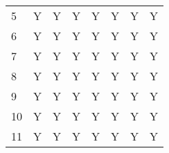 \begin{table}[hbt]
\begin{tabular}{@{}lccccccc@{}}
\cellcolor[HTML]{C0C0C0}5  & Y                                                 & Y                                                 & Y                                                 & Y                                                 & Y                                                 & Y                                                 & Y                                                 \\
\cellcolor[HTML]{C0C0C0}6  & Y                                                 & Y                                                 & Y                                                 & Y                                                 & Y                                                 & Y                                                 & Y                                                 \\
\cellcolor[HTML]{C0C0C0}7  & Y                                                 & Y                                                 & Y                                                 & Y                                                 & Y                                                 & Y                                                 & Y                                                 \\
\cellcolor[HTML]{C0C0C0}8  & Y                                                 & Y                                                 & Y                                                 & Y                                                 & Y                                                 & Y                                                 & Y                                                 \\
\cellcolor[HTML]{C0C0C0}9  & Y                                                 & Y                                                 & Y                                                 & Y                                                 & Y                                                 & Y                                                 & Y                                                 \\
\cellcolor[HTML]{C0C0C0}10 & Y                                                 & Y                                                 & Y                                                 & Y                                                 & Y                                                 & Y                                                 & Y                                                 \\
\cellcolor[HTML]{C0C0C0}11 & Y                                                 & Y                                                 & Y                                                 & Y                                                 & Y                                                 & Y                                                 & Y                                                
\end{tabular}
\end{table}